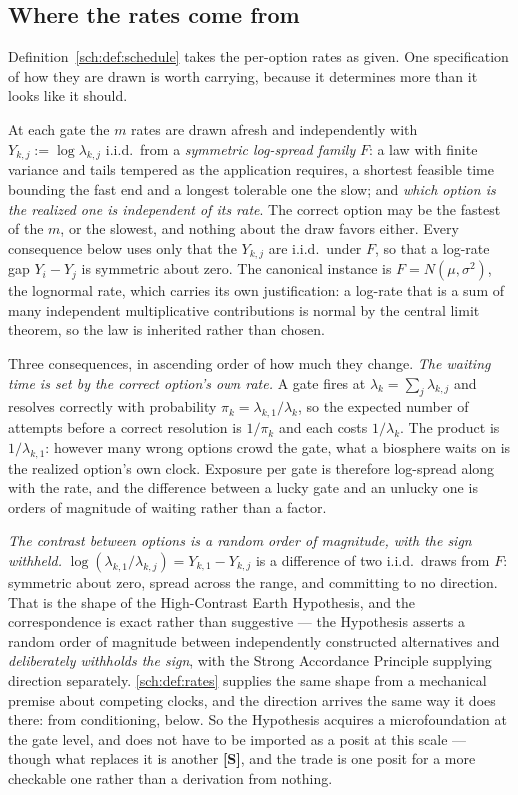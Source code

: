\subsection{Where the rates come from}\label{sch:subsub:rates}

Definition~\ref{sch:def:schedule} takes the per-option rates as given.
One specification of how they are drawn is worth carrying, because it
determines more than it looks like it should.

\begin{definition}\label{sch:def:rates}
At each gate the $m$ rates are drawn afresh and independently with
$Y_{k,j}:=\log\lambda_{k,j}$ i.i.d.\ from a \emph{symmetric log-spread
family} $F$: a law with finite variance and tails tempered as the
application requires, a shortest feasible time bounding the fast end
and a longest tolerable one the slow; and \emph{which option is the
realized one is independent of its rate}. The correct option may be the
fastest of the $m$, or the slowest, and nothing about the draw favors
either. Every consequence below uses only that the $Y_{k,j}$ are
i.i.d.\ under $F$, so that a log-rate gap $Y_i-Y_j$ is symmetric about
zero. The canonical instance is $F=N(\mu,\sigma^2)$, the lognormal
rate, which carries its own justification: a log-rate that is a sum of
many independent multiplicative contributions is normal by the central
limit theorem, so the law is inherited rather than chosen.
\end{definition}

Three consequences, in ascending order of how much they change. \emph{The waiting time is set by the correct option's own rate.} A gate
fires at $\lambda_k=\sum_j\lambda_{k,j}$ and resolves correctly with
probability $\pi_k=\lambda_{k,1}/\lambda_k$, so the expected number of
attempts before a correct resolution is $1/\pi_k$ and each costs
$1/\lambda_k$. The product is $1/\lambda_{k,1}$: however many wrong
options crowd the gate, what a biosphere waits on is the realized
option's own clock. Exposure per gate is therefore log-spread along with
the rate, and the difference between a lucky gate and an unlucky one is
orders of magnitude of waiting rather than a factor.

\emph{The contrast between options is a random order of magnitude, with
the sign withheld.} $\log(\lambda_{k,1}/\lambda_{k,j})=Y_{k,1}-Y_{k,j}$ is a
difference of two i.i.d.\ draws from $F$: symmetric about zero, spread
across the range, and committing to no direction. That is the shape of the High-Contrast
Earth Hypothesis, and the correspondence is exact rather than
suggestive --- the Hypothesis asserts a random order of magnitude between
independently constructed alternatives and \emph{deliberately withholds
the sign}, with the Strong Accordance Principle supplying direction
separately. \eqref{sch:def:rates} supplies the same shape from a
mechanical premise about competing clocks, and the direction arrives the
same way it does there: from conditioning, below. So the Hypothesis
acquires a microfoundation at the gate level, and does not have to be
imported as a posit at this scale --- though what replaces it is another
\textbf{[S]}, and the trade is one posit for a more checkable one rather
than a derivation from nothing.

